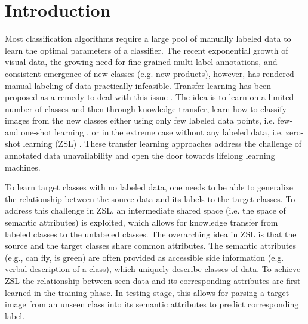 \documentclass[letterpaper]{article} %
\begin{document}
\section{Introduction}


Most classification algorithms require a large pool of manually labeled data to learn the optimal parameters of a classifier. The recent exponential growth of visual data, the growing need for fine-grained multi-label annotations, and consistent emergence of new classes (e.g. new products), however, has rendered manual labeling of data practically infeasible. Transfer learning has been proposed as a remedy to deal with this issue \cite{lampert2014attribute}. The idea is to learn on a limited number of classes and then through knowledge transfer, learn how to classify images from the new classes either using only few labeled data points, i.e. few- and one-shot learning \cite{fei2006one}, or in the extreme case without any labeled data, i.e. zero-shot learning (ZSL) \cite{lampert2014attribute}.  These transfer learning approaches  address the challenge of annotated data unavailability and open the door towards lifelong learning machines. %


To learn target classes with no labeled data, one needs to be able to generalize the relationship between the source data and its labels to the target classes.  To address this challenge in ZSL, an intermediate shared space (i.e. the space of semantic attributes) is exploited, which allows for knowledge transfer from labeled classes to the unlabeled classes. 
The overarching idea in ZSL is that the source and the target classes share common  attributes. The semantic attributes (e.g., can fly, is green) are often provided as accessible side information (e.g. verbal description of a class), which uniquely describe classes of data. To achieve ZSL the relationship between  seen data and its corresponding attributes are first learned in the training phase. In testing stage, this allows for parsing a target image from an unseen class into its semantic attributes to predict  corresponding label.
\end{document}
